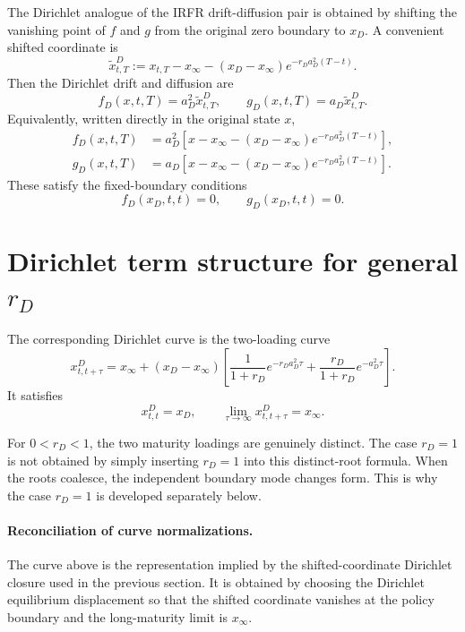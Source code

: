 \documentclass[11pt]{article}
\numberwithin{equation}{section}
\begin{document}
The Dirichlet analogue of the IRFR drift-diffusion pair is obtained by shifting the vanishing point of $f$ and $g$ from the original zero boundary to $x_D$. A convenient shifted coordinate is
\begin{equation}
\label{eq:dirichlet-shifted-coordinate}
\widetilde{x}^{D}_{t,T}
:=x_{t,T}-x_\infty-(x_D-x_\infty)e^{-r_Da_D^2(T-t)}.
\end{equation}
Then the Dirichlet drift and diffusion are
\begin{equation}
\label{eq:dirichlet-fg-shifted}
f_D(x,t,T)=a_D^2\widetilde{x}^{D}_{t,T},
\qquad
 g_D(x,t,T)=a_D\widetilde{x}^{D}_{t,T}.
\end{equation}
Equivalently, written directly in the original state $x$,
\begin{align*}
f_D(x,t,T)&=a_D^2\left[x-x_\infty-(x_D-x_\infty)e^{-r_Da_D^2(T-t)}\right],\\
g_D(x,t,T)&=a_D\left[x-x_\infty-(x_D-x_\infty)e^{-r_Da_D^2(T-t)}\right].
\end{align*}
These satisfy the fixed-boundary conditions
\begin{equation}
f_D(x_D,t,t)=0,
\qquad
 g_D(x_D,t,t)=0.
\end{equation}

\section{Dirichlet term structure for general \texorpdfstring{$r_D$}{rD}}

The corresponding Dirichlet curve is the two-loading curve
\begin{equation}
\label{eq:dirichlet-curve-general-r}
x^D_{t,t+\tau}
= x_\infty
+ (x_D-x_\infty)
\left[
\frac{1}{1+r_D}e^{-r_Da_D^2\tau}
+
\frac{r_D}{1+r_D}e^{-a_D^2\tau}
\right].
\end{equation}
It satisfies
\begin{equation}
x^D_{t,t}=x_D,
\qquad
\lim_{\tau\to\infty}x^D_{t,t+\tau}=x_\infty.
\end{equation}

For $0<r_D<1$, the two maturity loadings are genuinely distinct. The case $r_D=1$ is not obtained by simply inserting $r_D=1$ into this distinct-root formula. When the roots coalesce, the independent boundary mode changes form. This is why the case $r_D=1$ is developed separately below.

\paragraph{Reconciliation of curve normalizations.}
The curve above is the representation implied by the shifted-coordinate Dirichlet closure used in the previous section. It is obtained by choosing the Dirichlet equilibrium displacement so that the shifted coordinate vanishes at the policy boundary and the long-maturity limit is $x_\infty$.
\end{document}
